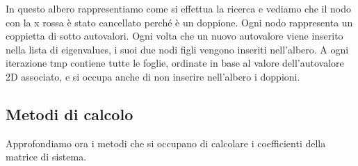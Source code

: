 \vspace{1cm}


In questo albero rappresentiamo come si effettua la ricerca e vediamo che il nodo con la x rossa \`e stato
cancellato perch\'e \`e un doppione.
Ogni nodo rappresenta un coppietta di sotto autovalori. Ogni volta che un nuovo autovalore viene
inserito nella lista di eigenvalues, i suoi due nodi figli vengono inseriti nell'albero.
A ogni iterazione tmp contiene tutte le foglie, ordinate in base al valore dell'autovalore 2D associato, e si 
occupa anche di non inserire nell'albero i doppioni.



\subsection{Metodi di calcolo}
Approfondiamo ora i metodi che si occupano di calcolare i coefficienti della matrice di sistema.

